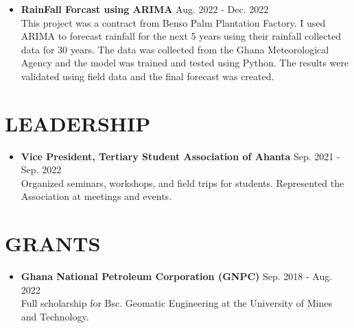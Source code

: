 \documentclass[a4paper,10pt]{article}
\begin{document}
\begin{itemize}[leftmargin=*]
    \item \textbf{RainFall Forcast using ARIMA} \hfill Aug. 2022 {-} Dec. 2022 \\
    This project was a contract from Benso Palm Plantation Factory. I used ARIMA to forecast rainfall for the next 5 years using their rainfall collected data for 30 years. The data was collected from the Ghana Meteorological Agency and
    the model was trained and tested using Python. The results were validated using field data and the final forecast was created.
\end{itemize}

\section*{LEADERSHIP}   
\begin{itemize}[leftmargin=*]
    \item \textbf{Vice President, Tertiary Student Association of Ahanta} \hfill Sep. 2021 {-} Sep. 2022 \\
    Organized seminars, workshops, and field trips for students. Represented the Association at meetings and events.
\end{itemize}

\section*{GRANTS}   
\begin{itemize}[leftmargin=*]
    \item \textbf{Ghana National Petroleum Corporation (GNPC)} \hfill Sep. 2018 {-} Aug. 2022 \\
    Full scholarship for Bsc. Geomatic Engineering at the University of Mines and Technology.
\end{itemize}
\end{document}
